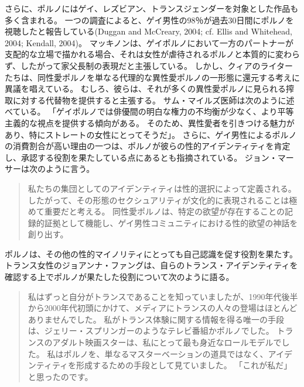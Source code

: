 \documentclass[paper=a4,book,openany]{jlreq}
\newcommand{\ig}[1]{}           %
\begin{document}
さらに、ポルノにはゲイ、レズビアン、トランスジェンダーを対象とした作品も多く含まれる。
一つの調査によると、ゲイ男性の98％が過去30日間にポルノを視聴したと報告している(Duggan and McCreary, 2004; cf. Ellis and Whitehead, 2004; Kendall, 2004)。
\nocite{duggan04:_body_image_eatin_disor_drive}\nocite{ellis04:_porn_again}
\nocite{kendall04:_educat_gay_male_youth}
マッキノンは、ゲイポルノにおいて一方のパートナーが支配的な立場で描かれる場合、それは女性が虐待されるポルノと本質的に変わらず、したがって家父長制の表現だと主張している\citep[pp.178--179]{mackinnon89:_towar_femin_theor_of_state}。
しかし、クィアのライターたちは、同性愛ポルノを単なる代理的な異性愛ポルノの一形態に還元する考えに異議を唱えている。
むしろ、彼らは、それが多くの異性愛ポルノに見られる搾取に対する代替物を提供すると主張する。
サム・マイルズ医師\ig{Sam Miles}は次のように述べている。
「ゲイポルノでは俳優間の明白な権力の不均衡が少なく、より平等主義的な視点を提供する傾向がある。
そのため、異性愛者を引きつける魅力があり、特にストレートの女性にとってそうだ」\citep{bloodworth18:_this_is_why_straig_men}。
さらに、ゲイ男性によるポルノの消費割合が高い理由の一つは、ポルノが彼らの性的アイデンティティを肯定し、承認する役割を果たしている点にあるとも指摘されている。
ジョン・マーサーは次のように言う。

\begin{quote}
私たちの集団としてのアイデンティティは性的選択によって定義される。
したがって、その形態のセクシュアリティが文化的に表現されることは極めて重要だと考える。
同性愛ポルノは、特定の欲望が存在することの記録的証拠として機能し、ゲイ男性コミュニティにおける性的欲望の神話を創り出す。
\citep[p.204]{ellis13:_porn_again}
\end{quote}
ポルノは、その他の性的マイノリティにとっても自己認識を促す役割を果たす。
トランス女性のジョアンナ・ファングは、自らのトランス・アイデンティティを確認する上でポルノが果たした役割について次のように語る。
\begin{quote}

  私はずっと自分がトランスであることを知っていましたが、1990年代後半から2000年代初頭にかけて、メディアにトランスの人々の登場はほとんどありませんでした。
私がトランス体験に関する情報を得る唯一の手段は、ジェリー・スプリンガーのようなテレビ番組かポルノでした。
トランスのアダルト映画スターは、私にとって最も身近なロールモデルでした。
私はポルノを、単なるマスターベーションの道具ではなく、アイデンティティを形成するための手段として見ていました。
「これが私だ」と思ったのです。
\citep{white17:_how_trans_affec_sex_drive_porn_consum}
\end{quote}
\end{document}
